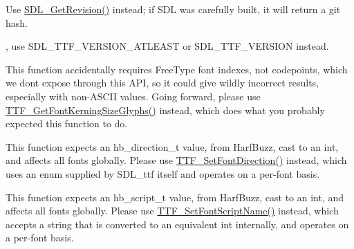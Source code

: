 
\begin{DoxyRefList}
\item[Global \mbox{\hyperlink{_s_d_l__version_8h_a3aaf4a973a60915fd9a30de51b17c3e4}{SDL\+\_\+\+Get\+Revision\+Number}} (void)]\label{deprecated__deprecated000006}%
%
Use \mbox{\hyperlink{_s_d_l__version_8h_a2bfe0579c07429a1090fdcc42a49460d}{SDL\+\_\+\+Get\+Revision()}} instead; if SDL was carefully built, it will return a git hash. 
\item[Global \mbox{\hyperlink{_s_d_l__ttf_8h_a2ba3940255fc228728d9eb0c5a815aad}{SDL\+\_\+\+TTF\+\_\+\+COMPILEDVERSION}} ]\label{deprecated__deprecated000001}%
%
, use SDL\+\_\+\+TTF\+\_\+\+VERSION\+\_\+\+ATLEAST or SDL\+\_\+\+TTF\+\_\+\+VERSION instead.  
\item[File \mbox{\hyperlink{_s_d_l__types_8h}{SDL\+\_\+types.h}} ]\label{deprecated__deprecated000005}%
%
  
\item[Global \mbox{\hyperlink{_s_d_l__ttf_8h_afa971c6ffc92e8d5e2a08cc396549756}{TTF\+\_\+\+Get\+Font\+Kerning\+Size}} (TTF\+\_\+\+Font $\ast$font, int prev\+\_\+index, int index)]\label{deprecated__deprecated000002}%
%
This function accidentally requires Free\+Type font indexes, not codepoints, which we don\textquotesingle{}t expose through this API, so it could give wildly incorrect results, especially with non-\/\+ASCII values. Going forward, please use \mbox{\hyperlink{_s_d_l__ttf_8h_a0e86fd47f470d6f21c47622035da50bd}{TTF\+\_\+\+Get\+Font\+Kerning\+Size\+Glyphs()}} instead, which does what you probably expected this function to do. 
\item[Global \mbox{\hyperlink{_s_d_l__ttf_8h_a56c4ce011601169540e6771a037f126a}{TTF\+\_\+\+Set\+Direction}} (int direction)]\label{deprecated__deprecated000003}%
%
This function expects an hb\+\_\+direction\+\_\+t value, from Harf\+Buzz, cast to an int, and affects all fonts globally. Please use \mbox{\hyperlink{_s_d_l__ttf_8h_a4986991c40e1353397099d2134928010}{TTF\+\_\+\+Set\+Font\+Direction()}} instead, which uses an enum supplied by SDL\+\_\+ttf itself and operates on a per-\/font basis. 
\item[Global \mbox{\hyperlink{_s_d_l__ttf_8h_a6ed08cb4253538af931e5e97505a856d}{TTF\+\_\+\+Set\+Script}} (int script)]\label{deprecated__deprecated000004}%
%
This function expects an hb\+\_\+script\+\_\+t value, from Harf\+Buzz, cast to an int, and affects all fonts globally. Please use \mbox{\hyperlink{_s_d_l__ttf_8h_ac893167cd8ad82c0342157c15d99dff2}{TTF\+\_\+\+Set\+Font\+Script\+Name()}} instead, which accepts a string that is converted to an equivalent int internally, and operates on a per-\/font basis.
\end{DoxyRefList}